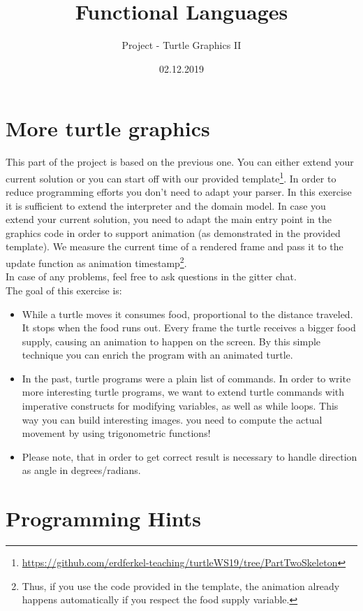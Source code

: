\documentclass[a4paper]{article}
\title{Functional Languages}
\author{Project - Turtle Graphics II}
\date{02.12.2019}
\begin{document}
\maketitle

\section{More turtle graphics}

This part of the project is based on the previous one. You can either extend your current solution or you can start off with our provided template\footnote{\url{https://github.com/erdferkel-teaching/turtleWS19/tree/PartTwoSkeleton}}.
In order to reduce programming efforts you don't need to adapt your parser. In this exercise it is sufficient to extend the interpreter and the domain model.
In case you extend your current solution, you need to adapt the main entry point in the graphics code in order to support animation (as demonstrated
in the provided template). We measure the current time of a rendered frame and pass it to the update function as animation timestamp\footnote{Thus, if you use the code provided in the template, the animation already happens automatically if you respect the food supply variable.}. \\

\noindent In case of any problems, feel free to ask questions in the gitter chat.\\

\noindent The goal of this exercise is:
\begin{itemize}
\item While a turtle moves it consumes food, proportional to the distance traveled. It stops when the food runs out. Every frame the turtle receives a bigger food supply, causing an animation to happen on the screen.
By this simple technique you can enrich the program with an animated turtle.
\item In the past, turtle programs were a plain list of commands. In order to write more interesting turtle programs, we want to extend
turtle commands with imperative constructs for modifying variables, as well as while loops.
This way you can build interesting images.
you need to compute the actual movement by using trigonometric functions!
\item Please note, that in order to get correct result is necessary to handle direction as angle in degrees/radians.
\end{itemize}


\section{Programming Hints}
\end{document}
